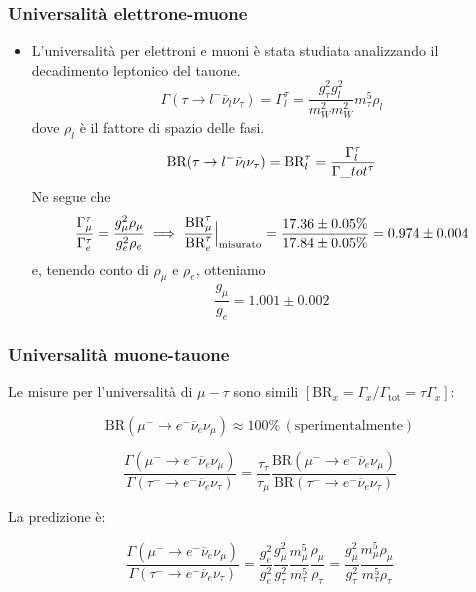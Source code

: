 \subsubsection{Universalità elettrone-muone}
\begin{itemize}
    \item L'universalità per elettroni e muoni è stata studiata analizzando il decadimento leptonico del tauone.
    \begin{equation*}
    \Gamma(\tau\to l^- \bar\nu_l \nu_\tau)=\Gamma_l^\tau=\frac{g_\tau^2g_l^2}{m_W^2m_W^2}m_\tau^5\rho_l
    \end{equation*}
    dove $\rho_l$ è il fattore di spazio delle fasi.
    \begin{equation*}
    \textnormal{BR}(\tau\to l^- \bar\nu_l \nu_\tau)=\textnormal{BR}_l^\tau=\frac{\Gamma_l^\tau}{\Gamma\_{tot}^\tau}
    \end{equation*}
    Ne segue che 
    \begin{equation*}
    \frac{\Gamma_\mu^\tau}{\Gamma_e^\tau}=\frac{g_\mu^2\rho_\mu}{g_e^2\rho_e}\implies \frac{\textnormal{BR}_\mu^\tau}{\textnormal{BR}_e^\tau}\Big|_{\textnormal{misurato}}=\frac{17.36\pm0.05\%}{17.84\pm0.05\%}=0.974\pm0.004
    \end{equation*}
    e, tenendo conto di $\rho_\mu$ e $\rho_e$, otteniamo
    \begin{equation*}
    \frac{g_\mu}{g_e}=1.001\pm0.002
    \end{equation*} 
\end{itemize}
\subsubsection{Universalità muone-tauone}
Le misure per l'universalità di  $\mu-\tau$ sono simili $\left[\text{BR}_x = \Gamma_x / \Gamma_\text{tot} = \tau \Gamma_x \right]$:

\[
\text{BR}(\mu^- \to e^- \overline{\nu}_e \nu_\mu) \approx 100\% \, (\text{sperimentalmente})
\]

\[
\frac{\Gamma(\mu^- \to e^- \overline{\nu}_e \nu_\mu)}{\Gamma(\tau^- \to e^- \overline{\nu}_e \nu_\tau)} =
\frac{\tau_\tau}{\tau_\mu} 
\frac{\text{BR}(\mu^- \to e^- \overline{\nu}_e \nu_\mu)}{\text{BR}(\tau^- \to e^- \overline{\nu}_e \nu_\tau)}
\]

La predizione è:

\[
\frac{\Gamma(\mu^- \to e^- \overline{\nu}_e \nu_\mu)}{\Gamma(\tau^- \to e^- \overline{\nu}_e \nu_\tau)} =\frac{g_e^2}{g_e^2}\frac{g_\mu^2}{g_\tau^2}\frac{m_\mu^5}{m_\tau^5}\frac{\rho_\mu}{\rho_\tau} =
\frac{g_\mu^2}{g_\tau^2}
\frac{m_\mu^5 \rho_\mu}{m_\tau^5 \rho_\tau}
\]

